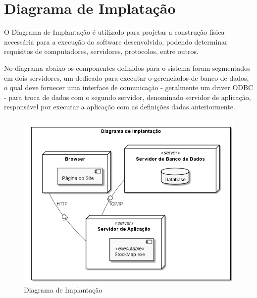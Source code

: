 \documentclass[rascunho,xindy,acronym,symbols]{fei}
\begin{document}
\section{Diagrama de Implatação} \label{diagramaImp}

O Diagrama de Implantação é utilizado para projetar a construção física necessária para a execução do software desenvolvido, podendo determinar requisitos de computadores, servidores, protocolos, entre outros.

No diagrama abaixo os componentes definidos para o sistema foram segmentados em dois servidores, um dedicado para executar o gerenciados de banco de dados, o qual deve fornecer uma interface de comunicação - geralmente um driver ODBC - para troca de dados com o segundo servidor, denominado servidor de aplicação, responsável por executar a aplicação com as definições dadas anteriormente.

\begin{figure}[H]
    \centering
    \includegraphics[width=\textwidth]{./Images/Diagrama_de_Implant.png}
    \caption{Diagrama de Implantação}
    \label{fig:diag_implant}
\end{figure}

\printbibliography

\end{document}
